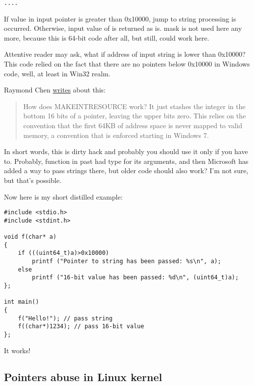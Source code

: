 \begin{lstlisting}
....

\end{lstlisting}

If value in input pointer is greater than 0x10000, jump to string processing is occurred.
Otherwise, input value of  is returned as is.
 mask is not used here any more, because this is 64-bit code after all, but still,  could work here.

Attentive reader may ask, what if address of input string is lower than 0x10000?
This code relied on the fact that there are no pointers below 0x10000 in Windows code, well, at least in Win32 realm.

Raymond Chen \href{https://blogs.msdn.microsoft.com/oldnewthing/20130925-00/?p=3123}{writes} about this:

\begin{framed}
\begin{quotation}
How does MAKE­INT­RESOURCE work? It just stashes the integer in the bottom 16 bits of a pointer, leaving the upper bits zero. This relies on the convention that the first 64KB of address space is never mapped to valid memory, a convention that is enforced starting in Windows 7.
\end{quotation}
\end{framed}

In short words, this is dirty hack and probably you should use it only if you have to.
Probably,  function in past had  type for its arguments, and then Microsoft has added a way to pass strings there,
but older code should also work? I'm not sure, but that's possible.

Now here is my short distilled example:

\begin{lstlisting}
#include <stdio.h>
#include <stdint.h>

void f(char* a)
{
	if (((uint64_t)a)>0x10000)
		printf ("Pointer to string has been passed: %s\n", a);
	else
		printf ("16-bit value has been passed: %d\n", (uint64_t)a);
};

int main()
{
	f("Hello!"); // pass string
	f((char*)1234); // pass 16-bit value
};
\end{lstlisting}

It works!

\subsection{Pointers abuse in Linux kernel}

